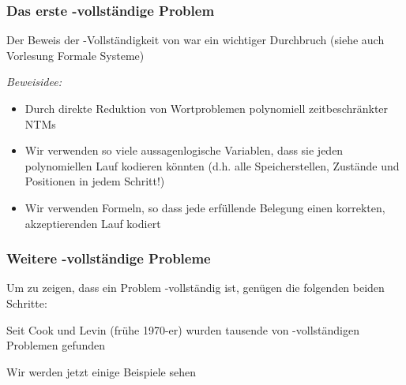 \documentclass[aspectratio=1610,onlymath]{beamer}
\begin{document}
\begin{frame}\frametitle{Das erste -vollständige Problem}

Der Beweis der -Vollständigkeit von  war ein wichtiger Durchbruch (siehe auch Vorlesung Formale Systeme)
\bigskip

\emph{Beweisidee:}
\begin{itemize}
\item Durch direkte Reduktion von Wortproblemen polynomiell zeitbeschränkter NTMs
\item Wir verwenden so viele aussagenlogische Variablen, dass sie jeden polynomiellen
Lauf kodieren könnten (d.h. alle Speicherstellen, Zustände und Positionen in jedem Schritt!)
\item Wir verwenden Formeln, so dass jede erfüllende Belegung einen korrekten, akzeptierenden Lauf kodiert
\end{itemize}

\end{frame}

\begin{frame}\frametitle{Weitere -vollständige Probleme}

Um zu zeigen, dass ein Problem  -vollständig ist, genügen 
die folgenden beiden Schritte:\medskip


Seit Cook und Levin (frühe 1970-er) wurden tausende von -vollständigen Problemen gefunden
\bigskip

Wir werden jetzt einige Beispiele sehen

\end{frame}
\end{document}
